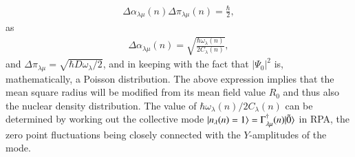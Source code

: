 \begin{align}\label{eq0.1.121}
\Delta\alpha_{\lambda\mu}{(n)}\Delta\pi_{\lambda\mu}{(n)}=\frac{\hbar}{2},
\end{align}
as
\begin{align}\label{eq1.8.2}
\Delta\alpha_{\lambda\mu}{(n)}=\sqrt{\frac{\hbar\omega_\lambda(n)}{2C_\lambda(n)}},
\end{align}
and $\Delta\pi_{\lambda\mu}=\sqrt{\hbar D\omega_\lambda/2}$, and in keeping with the fact that $|\Psi_0|^2$ is, mathematically, a Poisson distribution. The above expression implies that the mean square radius will be modified from its mean field value $R_0$  and thus also the nuclear density distribution. The value of $\hbar\omega_\lambda(n)/2C_\lambda(n)$ can be determined by working out the collective mode $|{n_\lambda(n)=1} \rangle=\Gamma_{\lambda\mu}^\dagger(n)|{\tilde 0} \rangle$ in RPA,  the zero point fluctuations being closely connected with the $Y$-amplitudes of the mode.

